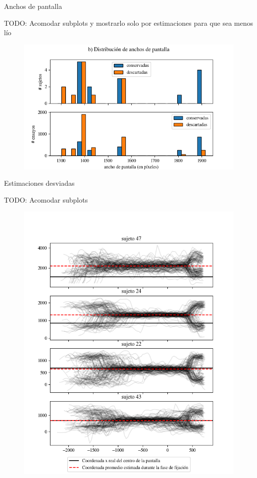 \documentclass[aspectratio=169]{beamer}
\begin{document}
\begin{frame}{Anchos de pantalla}

  TODO: Acomodar subplots y mostrarlo solo por estimaciones para que sea menos
  lío
  \begin{figure}
    \includegraphics[width=0.7\linewidth]{img/second-widths-distribution.png}
  \end{figure}

\end{frame}

\begin{frame}{Estimaciones desviadas}

  TODO: Acomodar subplots
  \begin{figure}
    \includegraphics[width=0.8\linewidth]{img/skewed-estimations-examples.png}
  \end{figure}

\end{frame}
\end{document}
